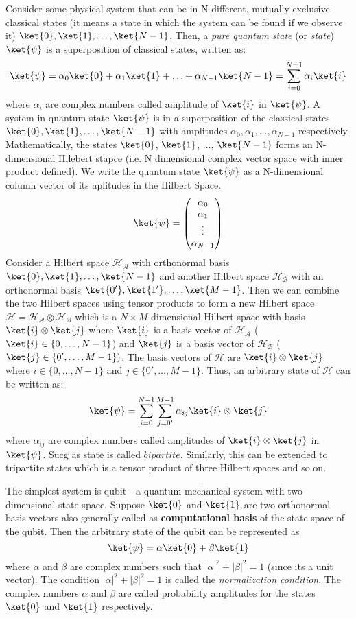 \documentclass[12pt, oneside]{book}
\theoremstyle{definition}
\theoremstyle{definition}
\theoremstyle{remark}
\begin{document}
Consider some physical system that can be in N different, mutually exclusive classical states (it means a state in which the system can be found 
if we observe it) $\ket{0},\ket{1},\ldots,\ket{N-1}$. Then, a \textit{pure quantum state} (or \textit{state}) $\ket{\psi}$ is a superposition of classical states, written as:
\[
    \ket{\psi}=\alpha_0\ket{0}+\alpha_1\ket{1}+\ldots+\alpha_{N-1}\ket{N-1} = \sum_{i=0}^{N-1}\alpha_i\ket{i}
\]
where $\alpha_i$ are complex numbers called amplitude of $\ket{i}$ in $\ket{\psi}$. A system in quantum state
$\ket{\psi}$ is in a superposition of the classical states $\ket{0},\ket{1},\ldots,\ket{N-1}$ with amplitudes $\alpha_0,\alpha_1,\ldots,\alpha_{N-1}$ respectively.
Mathematically, the states $\ket{0}$, $\ket{1}$, $\ldots$, $\ket{N-1}$ forms an N-dimensional Hilebert stapce (i.e. N dimensional complex vector space with inner product defined).
We write the quantum state $\ket{\psi}$ as a N-dimensional column vector of its aplitudes in the Hilbert Space.
\[ 
    \ket{\psi}=\begin{pmatrix} \alpha_0 \\ \alpha_1 \\ \vdots \\ \alpha_{N-1} \end{pmatrix}
\]
Consider a Hilbert space $\mathcal{H_A}$ with orthonormal basis $\ket{0},\ket{1},\ldots,\ket{N-1}$
and another Hilbert space $\mathcal{H_B}$ with an orthonormal basis $\ket{0'},\ket{1'},\ldots,\ket{M-1}$. Then we can
combine the two Hilbert spaces using tensor products to form a new Hilbert space $\mathcal{H}=\mathcal{H_A}\otimes\mathcal{H_B}$ which
is a $N\times M$ dimensional Hilbert space with basis $\ket{i}\otimes\ket{j}$ where $\ket{i}$ is a basis vector of $\mathcal{H_A}$ ($\ket{i} \in \{0,\ldots,N-1\}$) 
and $\ket{j}$ is a basis vector of $\mathcal{H_B}$ ($\ket{j} \in \{0',\ldots,M-1\})$. The basis vectors of $\mathcal{H}$ are $\ket{i}\otimes\ket{j}$ where $i \in \{0,\ldots,N-1\}$ and $j \in \{0',\ldots,M-1\}$.
Thus, an arbitrary state of $\mathcal{H}$ can be written as:
\[
    \ket{\psi}=\sum_{i=0}^{N-1}\sum_{j=0'}^{M-1}\alpha_{ij}\ket{i}\otimes\ket{j}
\]
where $\alpha_{ij}$ are complex numbers called amplitudes of $\ket{i}\otimes\ket{j}$ in $\ket{\psi}$.
Sucg as state is called $\mathit{bipartite}$. Similarly, this can be extended to tripartite states which is a tensor product of three Hilbert spaces and so on.

The simplest system is qubit - a quantum mechanical system with two-dimensional state space. Suppose $\ket{0}$ and
$\ket{1}$ are two orthonormal basis vectors also generally called as \textbf{computational basis} of the state space of the qubit. Then the arbitrary state of the qubit can be represented as
\[
    \ket{\psi}=\alpha\ket{0}+\beta\ket{1}
\]
where $\alpha$ and $\beta$ are complex numbers such that $|\alpha|^2+|\beta|^2=1$ (since its a unit vector). The condition 
$|\alpha|^2+|\beta|^2=1$ is called the \textit{normalization condition}. The complex numbers $\alpha$ and $\beta$ are called probability amplitudes
for the states $\ket{0}$ and $\ket{1}$ respectively.
\end{document}
